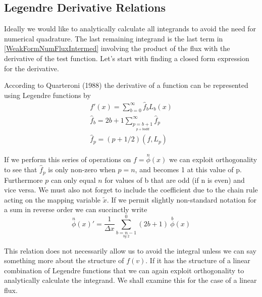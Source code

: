 \documentclass[letterpaper]{article}
\begin{document}
\subsection{Legendre Derivative Relations}
Ideally we would like to analytically calculate all integrands to avoid the need for numerical quadrature. The last remaining integrand is the last term in \eqref{WeakFormNumFluxIntermed} involving the product of the flux with the derivative of the test function. Let's start with finding a closed form expression for the derivative.

According to Quarteroni (1988) the derivative of a function can be represented using Legendre functions by
	\begin{gather*}\label{DerivativeLeg}
	f'(x) = \sum_{b=0}^\infty \hat{f}_b L_b(x)\\
	\hat{f}_b = 2b+1 \sum_{\underset{p+b odd}{p=b+1}}^\infty \hat{f}_p\\
	\hat{f}_p = (p+1/2) (f,L_p)
	\end{gather*}

If we perform this series of operations on $f=\overset{n}{\phi}(x)$ we can exploit orthogonality to see that $\hat{f}_p$ is only non-zero when $p=n$, and becomes 1 at this value of p. Furthermore $p$ can only equal $n$ for values of b that are odd (if n is even) and vice versa. We must also not forget to include the coefficient due to the chain rule acting on the mapping variable $\tilde{x}$. If we permit slightly non-standard notation for a sum in reverse order we can succinctly write
	\begin{equation}\label{WeakFormNumFlux}
	\overset{n}{\phi}(x)' = \frac{1}{\Delta x} \sum_{\underset{by \; 2}{b=n-1}}^0 (2b+1) \:\overset{b}{\phi}(x)
	\end{equation}

This relation does not necessarily allow us to avoid the integral unless we can say something more about the structure of $f(v)$. If it has the structure of a linear combination of Legendre functions that we can again exploit orthogonality to analytically calculate the integrand. We shall examine this for the case of a linear flux.
\end{document}
